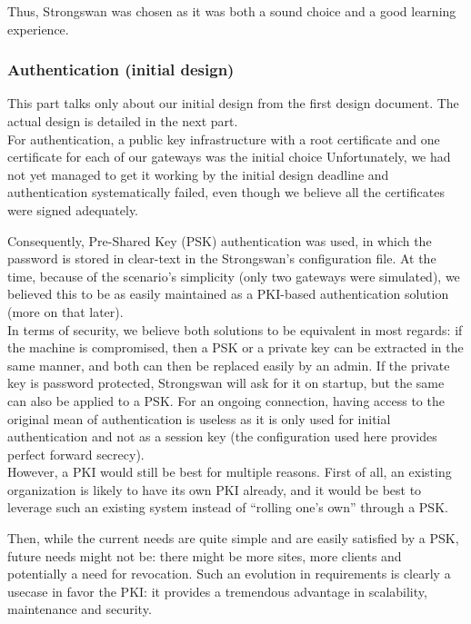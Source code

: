 \documentclass[paper=a4, fontsize=11pt]{scrartcl}
\begin{document}
Thus, Strongswan was chosen as it was both a sound choice and a good learning
experience.

\subsubsection{Authentication (initial design)}

\huge \danger{} \normalsize
This part talks only about our initial design from the first design document.
The actual design is detailed in the next part.
\\

For authentication, a public key infrastructure with a root certificate and one
certificate for each of our gateways was the initial choice
Unfortunately, we had not yet managed to get it working by the initial design
deadline and authentication systematically failed, even though we believe all the
certificates were signed adequately.

Consequently, Pre-Shared Key (PSK) authentication was used,
in which the password is stored in clear-text in the Strongswan's configuration
file.
At the time, because of the scenario's simplicity (only two gateways were
simulated), we believed this to be as easily maintained as a
PKI-based authentication solution (more on that later).\\

In terms of security, we believe both solutions to be equivalent in most
regards: if the machine is compromised, then a PSK or a private key can be
extracted in the same manner, and both can then be replaced easily by an admin. 
If the private key is password protected, Strongswan will ask for it on startup,
but the same can also be applied to a PSK\@.
For an ongoing connection, having access to the original mean of authentication
is useless as it is only used for initial authentication and not as a session
key (the configuration used here provides perfect forward secrecy).\\

However, a PKI would still be best for multiple reasons.
First of all, an existing organization is likely to have its own PKI already,
and it would be best to leverage such an existing system instead of ``rolling
one's own'' through a PSK\@.

Then, while the current needs are quite simple and are easily satisfied by a
PSK, future needs might not be: there might be more sites, more clients and
potentially a need for revocation.
Such an evolution in requirements is clearly a usecase in favor the PKI\@: it
provides a tremendous advantage in scalability, maintenance and security.
\end{document}
